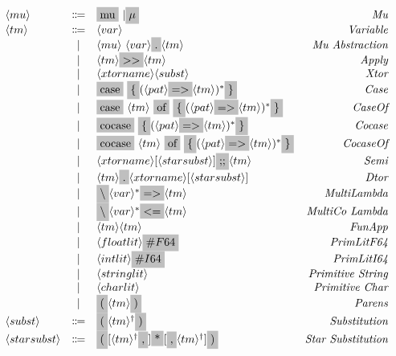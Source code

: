 \documentclass[11pt]{article}
\newcommand{\nonterminal}[1]{\langle #1 \rangle}
\newcommand{\terminal}[1]{\colorbox{lightgray}{\vphantom{X}#1}}
\newcommand{\commalist}[1]{#1^{\dagger}}
\begin{document}
\[
  \begin{array}{lclr}
    \nonterminal{mu} & \Coloneqq & \terminal{mu}\ | \terminal{$\mu$} & \emph{Mu} \\
    \nonterminal{tm} & \Coloneqq & \nonterminal{var} & \emph{Variable} \\
    & | & \nonterminal{mu}\ \nonterminal{var} \terminal{.} \nonterminal{tm} & \textit{Mu Abstraction} \\
    & | & \nonterminal{tm} \terminal{$>>$} \nonterminal{tm} & \textit{Apply} \\
    & | & \nonterminal{xtorname}\nonterminal{subst} & \emph{Xtor} \\
    & | & \terminal{case}\ \terminal{\{} (\nonterminal{pat} \terminal{$=>$} \nonterminal{tm})^{\ast} \terminal{\}} & \emph{Case} \\
    & | & \terminal{case}\ \nonterminal{tm}\ \terminal{of}\ \terminal{\{} (\nonterminal{pat} \terminal{$=>$} \nonterminal{tm})^{\ast} \terminal{\}} & \emph{CaseOf} \\
    & | & \terminal{cocase}\ \terminal{\{} (\nonterminal{pat} \terminal{$=>$} \nonterminal{tm})^{\ast} \terminal{\}} & \emph{Cocase} \\
    & | & \terminal{cocase}\ \nonterminal{tm}\ \terminal{of}\ \terminal{\{} (\nonterminal{pat} \terminal{$=>$} \nonterminal{tm})^{\ast} \terminal{\}} & \emph{CocaseOf} \\
    & | & \nonterminal{xtorname}[\nonterminal{starsubst}]\terminal{;;}\nonterminal{tm} & \emph{Semi} \\
    & | & \nonterminal{tm}\terminal{.}\nonterminal{xtorname}[\nonterminal{starsubst}] & \emph{Dtor} \\
    & | & \terminal{$\backslash$} \nonterminal{var}^{\ast}\terminal{$=>$} \nonterminal{tm} & \emph{MultiLambda} \\
    & | & \terminal{$\backslash$} \nonterminal{var}^{\ast}\terminal{$<=$} \nonterminal{tm} & \emph{MultiCo  Lambda} \\
    & | & \nonterminal{tm} \nonterminal{tm} & \emph{FunApp} \\
    & | & \nonterminal{floatlit}\terminal{$\#F64$} & \emph{PrimLitF64} \\
    & | & \nonterminal{intlit}\terminal{$\#I64$} & \emph{PrimLitI64} \\
    & | & \nonterminal{stringlit} & \emph{Primitive String} \\
    & | & \nonterminal{charlit} & \emph{Primitive Char} \\
    & | & \terminal{(} \nonterminal{tm} \terminal{)} & \emph{Parens} \\
    \nonterminal{subst} & \Coloneqq & \terminal{(} \commalist{\nonterminal{tm}} \terminal{)} & \emph{Substitution} \\
    \nonterminal{starsubst} & \Coloneqq & \terminal{(} \commalist{[\nonterminal{tm}}\terminal{,}] \terminal{*} [\terminal{,}\commalist{\nonterminal{tm}}] \terminal{)} & \emph{Star Substitution} \\ 
  \end{array}
\]
\end{document}
